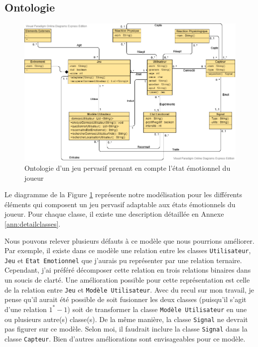 \documentclass[11pt]{article}
\begin{document}
	\subsection{Ontologie}\label{sec:ontologie}
		\begin{figure}[t]
			\centering
			\includegraphics[scale=0.5]{../include/ontologie_stage_cnam-v2-5.png}
			\caption{Ontologie d'un jeu pervasif prenant en compte l'état émotionnel du joueur}
			\label{fig:modele}
		\end{figure}
		Le diagramme de la Figure \ref{fig:modele} représente notre modélisation pour les différents éléments qui composent un jeu pervasif adaptable aux états émotionnels du joueur.
		Pour chaque classe, il existe une description détaillée en Annexe \ref{ann:detailclasses}.\par
		Nous pouvons relever plusieurs défauts à ce modèle que nous pourrions améliorer.
		Par exemple, il existe dans ce modèle une relation entre les classes \texttt{Utilisateur}, \texttt{Jeu} et \texttt{Etat Emotionnel} que j'aurais pu représenter par une relation ternaire.
		Cependant, j'ai préféré décomposer cette relation en trois relations binaires dans un soucis de clarté.
		Une amélioration possible pour cette représentation est celle de la relation entre \texttt{Jeu} et \texttt{Modèle Utilisateur}.
		Avec du recul sur mon travail, je pense qu'il aurait été possible de soit fusionner les deux classes (puisqu'il s'agit d'une relation $1^* - 1$) soit de transformer la classe \texttt{Modèle Utilisateur} en une ou plusieurs autre(s) classe(s).
		De la même manière, la classe \texttt{Signal} ne devrait pas figurer sur ce modèle.
		Selon moi, il faudrait inclure la classe \texttt{Signal} dans la classe \texttt{Capteur}.
		Bien d'autres améliorations sont envisageables pour ce modèle.
\end{document}
